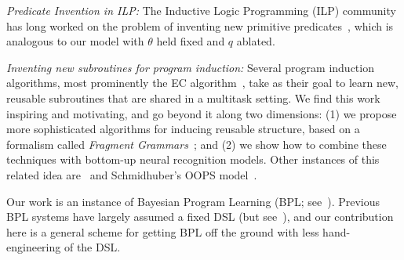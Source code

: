 \documentclass{article}
\begin{document}
 \noindent \emph{Predicate Invention in ILP:} The Inductive Logic Programming (ILP) community
 has long worked on the problem of inventing new primitive predicates~\cite{DBLP:conf/ecai/LinDETM14,muggleton2015meta}, which is analogous to our model with $\theta$ held fixed and $q$ ablated.

 \noindent \emph{Inventing new subroutines for program induction:}
 Several program induction algorithms, most prominently the EC algorithm~\cite{Dechter:2013:BLV:2540128.2540316}, take as their goal to learn new, reusable subroutines that are shared in a multitask setting. We find this work inspiring and motivating,
 and go beyond it along two dimensions: (1) we propose more sophisticated algorithms for
 inducing reusable structure, based on a formalism called \emph{Fragment Grammars}~\cite{tim};
 and (2) we show how to combine these techniques with bottom-up neural recognition models.
 Other instances of this related idea are~\cite{DBLP:conf/icml/LiangJK10} and Schmidhuber's OOPS model~\cite{schmidhuber2004optimal}.
 
 
 

 






Our work is an instance of
 Bayesian Program
 Learning (BPL; see~\citep{lake2013one,Dechter:2013:BLV:2540128.2540316,ellis2016sampling,DBLP:conf/icml/LiangJK10}). Previous BPL systems have largely assumed a fixed DSL (but see~\cite{DBLP:conf/icml/LiangJK10}),
 and our contribution here is a general scheme for getting BPL off the ground with less hand-engineering of the DSL.
 
 


\end{document}
